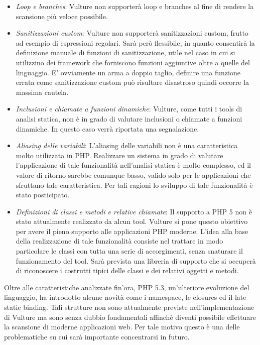 \begin{itemize}
\item \emph{Loop e branches}: Vulture non supporterà loop e branches al fine di rendere la scansione più veloce possibile.
\item \emph{Sanitizzazioni custom}: Vulture non supporterà sanitizzazioni custom, frutto ad esempio di espressioni regolari. Sarà però flessibile, in quanto consentirà la definizione manuale di funzioni di sanitizzazione, utile nel caso in cui si utilizzino dei framework che forniscono funzioni aggiuntive oltre a quelle del linguaggio. E' ovviamente un arma a doppio taglio, definire una funzione errata come sanitizzazione custom può risultare disastroso quindi occorre la massima cautela.
\item \emph{Inclusioni e chiamate a funzioni dinamiche}: Vulture, come tutti i tools di analisi statica, non è in grado di valutare inclusioni o chiamate a funzioni dinamiche. In questo caso verrà riportata una segnalazione.
\item \emph{Aliasing delle variabili}: L'aliasing delle variabili non è una caratteristica molto utilizzata in PHP. Realizzare un sistema in grado di valutare l'applicazione di tale funzionalità nell'analisi statica è molto complesso, ed il valore di ritorno sarebbe comunque basso, valido solo per le applicazioni che sfruttano tale caratteristica. Per tali ragioni lo sviluppo di tale funzionalità è stato posticipato.
\item \emph{Definizioni di classi e metodi e relative chiamate}: Il supporto a PHP 5 non è stato attualmente realizzato da alcun tool. Vulture si pone questo obiettivo per avere il pieno supporto alle applicazioni PHP moderne. L'idea alla base della realizzazione di tale funzionalità consiste nel trattare in modo particolare le classi con tutta una serie di accorgimenti, senza snaturare il funzionamento del tool. Sarà prevista una libreria di supporto che si occuperà di riconoscere i costrutti tipici delle classi e dei relativi oggetti e metodi.
\end{itemize}

Oltre alle caratteristiche analizzate fin'ora, PHP 5.3, un'ulteriore evoluzione del linguaggio, ha introdotto alcune novità come i namespace, le closures ed il late static binding. Tali strutture non sono attualmente previste nell'implementazione di Vulture ma sono senza dubbio fondamentali affinchè diventi possibile effettuare la scansione di moderne applicazioni web. Per tale motivo questo è una delle problematiche su cui sarà importante concentrarsi in futuro.

